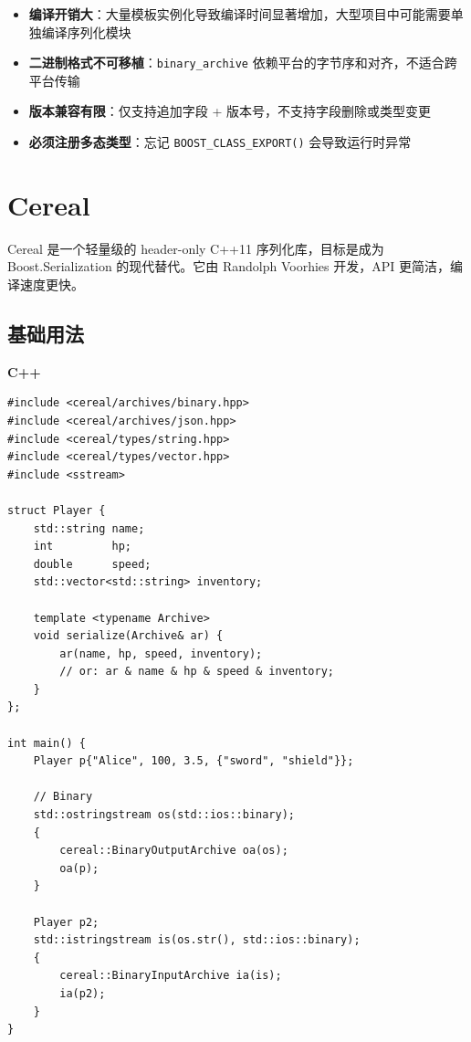 \documentclass[12pt,a4paper,fontset=fandol]{ctexbook}
\newcommand{\Fn}[1]{\texttt{#1()}}
\newcommand{\Tp}[1]{\texttt{#1}}
\newcommand{\cpplabel}{%
  \noindent\begin{tcolorbox}[colback=algheadbg,coltext=white,
    sharp corners,boxrule=0pt,width=3.0em,height=1.4em,
    halign=center,valign=center,nobeforeafter,left=0pt,right=0pt,
    top=0pt,bottom=0pt]\small\bfseries C++\end{tcolorbox}}
\begin{document}
\begin{warning}[title={Boost.Serialization 常见陷阱}]
\begin{itemize}[nosep]
  \item \textbf{编译开销大}：大量模板实例化导致编译时间显著增加，大型项目中可能需要单独编译序列化模块
  \item \textbf{二进制格式不可移植}：\Tp{binary\_archive} 依赖平台的字节序和对齐，不适合跨平台传输
  \item \textbf{版本兼容有限}：仅支持追加字段 + 版本号，不支持字段删除或类型变更
  \item \textbf{必须注册多态类型}：忘记 \Fn{BOOST\_CLASS\_EXPORT} 会导致运行时异常
\end{itemize}
\end{warning}

\chapter{Cereal}\label{ch:cereal}

Cereal 是一个轻量级的 header-only C++11 序列化库，目标是成为 Boost.Serialization 的现代替代。它由 Randolph Voorhies 开发，API 更简洁，编译速度更快。

\section{基础用法}\label{sec:cereal-basic}

\cpplabel
\begin{lstlisting}[caption={Cereal: 侵入式序列化}]
#include <cereal/archives/binary.hpp>
#include <cereal/archives/json.hpp>
#include <cereal/types/string.hpp>
#include <cereal/types/vector.hpp>
#include <sstream>

struct Player {
    std::string name;
    int         hp;
    double      speed;
    std::vector<std::string> inventory;

    template <typename Archive>
    void serialize(Archive& ar) {
        ar(name, hp, speed, inventory);
        // or: ar & name & hp & speed & inventory;
    }
};

int main() {
    Player p{"Alice", 100, 3.5, {"sword", "shield"}};

    // Binary
    std::ostringstream os(std::ios::binary);
    {
        cereal::BinaryOutputArchive oa(os);
        oa(p);
    }

    Player p2;
    std::istringstream is(os.str(), std::ios::binary);
    {
        cereal::BinaryInputArchive ia(is);
        ia(p2);
    }
}
\end{lstlisting}
\end{document}
